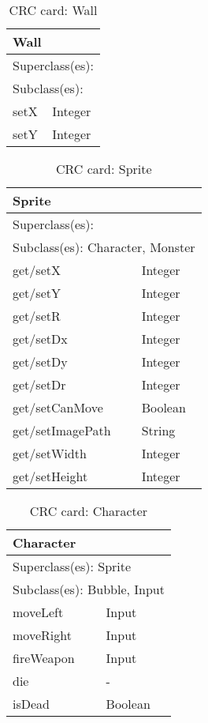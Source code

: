 \begin{table}[]
\centering
\label{crc_wall}
\begin{tabular}{|l|l|}
\hline
\multicolumn{2}{|l|}{Wall} \\ \hline
\multicolumn{2}{|l|}{Superclass(es):} \\ \hline
\multicolumn{2}{|l|}{Subclass(es):} \\ \hline
setX           & Integer \\ \hline
setY           & Integer\\ \hline
\end{tabular}
\caption{CRC card: Wall}
\end{table}

\begin{table}[]
\centering
\label{crc_sprite}
\begin{tabular}{|l|l|}
\hline
\multicolumn{2}{|l|}{Sprite} \\ \hline
\multicolumn{2}{|l|}{Superclass(es):} \\ \hline
\multicolumn{2}{|l|}{Subclass(es): Character, Monster} \\ \hline
get/setX           & Integer \\ \hline
get/setY           & Integer \\ \hline
get/setR           & Integer \\ \hline
get/setDx          & Integer \\ \hline
get/setDy          & Integer \\ \hline
get/setDr          & Integer \\ \hline
get/setCanMove     & Boolean \\ \hline
get/setImagePath   & String \\ \hline
get/setWidth       & Integer \\ \hline
get/setHeight      & Integer \\ \hline
\end{tabular}
\caption{CRC card: Sprite}
\end{table}

\begin{table}[]
\centering
\label{crc_character}
\begin{tabular}{|l|l|}
\hline
\multicolumn{2}{|l|}{Character} \\ \hline
\multicolumn{2}{|l|}{Superclass(es): Sprite} \\ \hline
\multicolumn{2}{|l|}{Subclass(es): Bubble, Input} \\ \hline
moveLeft            & Input \\ \hline
moveRight           & Input \\ \hline
fireWeapon          & Input \\ \hline
die                 & - \\ \hline
isDead              & Boolean \\ \hline
\end{tabular}
\caption{CRC card: Character}
\end{table}

